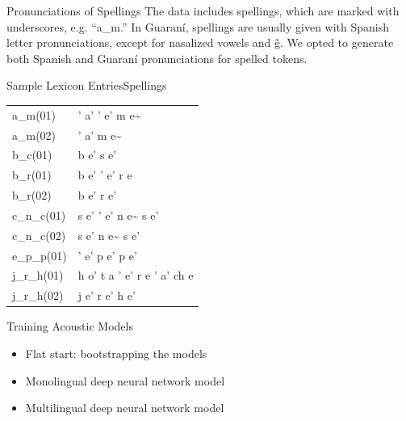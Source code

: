 \begin{frame}{Pronunciations of Spellings}{}
  The data includes spellings, which are marked with underscores, e.g. ``a\_m.''
  \vfill
  In Guaran\'{i}, spellings are usually given with
  Spanish letter pronunciations, except for nasalized vowels and
  \~{g}.
  \vfill
  We opted to generate both Spanish and Guaran\'{i} pronunciations for
  spelled tokens.
\end{frame}

\begin{frame}{Sample Lexicon Entries}{Spellings}
  \centering
  \begin{tabular}{@{}ll@{}}
    a\_m(01)    & ' a' ' e' m e\~{} \\
    a\_m(02)    & ' a' m e\~{} \\
    b\_c(01)    & b e' s e' \\
    b\_r(01)    & b e' ' e' r e \\
    b\_r(02)    & b e' r e' \\
    c\_n\_c(01) & s e' ' e' n e\~{} s e' \\
    c\_n\_c(02) & s e' n e\~{} s e' \\
    e\_p\_p(01) & ' e' p e' p e' \\
    j\_r\_h(01) & h o' t a ' e' r e ' a' ch e \\
    j\_r\_h(02) & j e' r e' h e' \\
  \end{tabular}
\end{frame}

\begin{frame}{Training Acoustic Models}{}
  \begin{itemize}
  \item Flat start: bootstrapping the models
  \item Monolingual deep neural network model
  \item Multilingual deep neural network model
  \end{itemize}
\end{frame}

